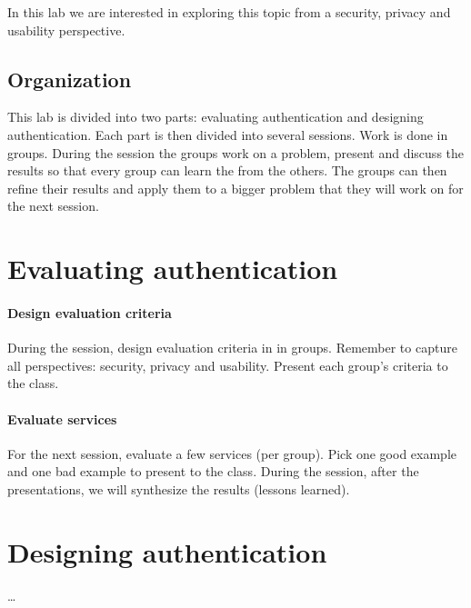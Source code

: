 In this lab we are interested in exploring this topic from a security, privacy 
and usability perspective.

\subsection{Organization}

This lab is divided into two parts: evaluating authentication and designing 
authentication.
Each part is then divided into several sessions.
Work is done in groups.
During the session the groups work on a problem, present and discuss the 
results so that every group can learn the from the others.
The groups can then refine their results and apply them to a bigger problem 
that they will work on for the next session.


\section{Evaluating authentication}

\paragraph{Design evaluation criteria}

During the session, design evaluation criteria in in groups.
Remember to capture all perspectives: security, privacy and usability.
Present each group's criteria to the class.

\paragraph{Evaluate services}

For the next session, evaluate a few services (per group).
Pick one good example and one bad example to present to the class.
During the session, after the presentations, we will synthesize the results 
(lessons learned).


\section{Designing authentication}

\dots



\begin{frame}[allowframebreaks]
  \printbibliography
\end{frame}
